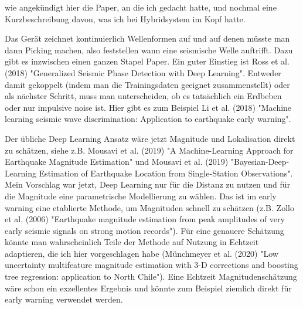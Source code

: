 \documentclass[thesis.tex]{subfiles}
\begin{document}

wie angekündigt hier die Paper, an die ich gedacht hatte, und nochmal eine Kurzbeschreibung davon, was ich bei Hybridsystem im Kopf hatte.

Das Gerät zeichnet kontinuierlich Wellenformen auf und auf denen müsste man dann Picking machen, also feststellen wann eine seismische Welle auftrifft. Dazu gibt es inzwischen einen ganzen Stapel Paper. Ein guter Einstieg ist Ross et al. (2018) "Generalized Seismic Phase Detection with Deep Learning". Entweder damit gekoppelt (indem man die Trainingsdaten geeignet zusammenstellt) oder als nächster Schritt, muss man unterscheiden, ob es tatsächlich ein Erdbeben oder nur impulsive noise ist. Hier gibt es zum Beispiel Li et al. (2018) "Machine learning seismic wave discrimination: Application to earthquake early warning".

Der übliche Deep Learning Ansatz wäre jetzt Magnitude und Lokalisation direkt zu schätzen, siehe z.B. Mousavi et al. (2019) "A Machine-Learning Approach for Earthquake Magnitude Estimation" und Mousavi et al. (2019) "Bayesian-Deep-Learning Estimation of Earthquake Location from Single-Station Observations". Mein Vorschlag war jetzt, Deep Learning nur für die Distanz zu nutzen und für die Magnitude eine parametrische Modellierung zu wählen. Das ist im early warning eine etablierte Methode, um Magnituden schnell zu schätzen (z.B. Zollo et al. (2006) "Earthquake magnitude estimation from peak amplitudes of very early seismic signals on strong motion records"). Für eine genauere Schätzung könnte man wahrscheinlich Teile der Methode auf Nutzung in Echtzeit adaptieren, die ich hier vorgeschlagen habe (Münchmeyer et al. (2020) "Low uncertainty multifeature magnitude estimation with 3-D corrections and boosting tree regression: application to North Chile"). Eine Echtzeit Magnitudenschätzung wäre schon ein exzellentes Ergebnis und könnte zum Beispiel ziemlich direkt für early warning verwendet werden.

\listoftodos
\end{document}
